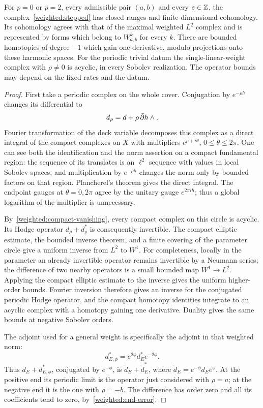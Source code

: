 \begin{proposition}\label{weighted:fredholm}
For $p=0$ or $p=2$, every admissible pair $(a,b)$ and every $s\in\mathbb Z$,
the complex~\eqref{weighted:stepped} has closed ranges and
finite-dimensional cohomology. Its cohomology agrees with that of the
maximal weighted $L^2$ complex and is represented by forms which belong
to $W^k_{a,b}$ for every $k$. There are bounded homotopies of degree $-1$
which gain one derivative, modulo projections onto these harmonic
spaces. For the periodic trivial datum the single-linear-weight complex
with $\rho\ne0$ is acyclic, in every Sobolev realization.
The operator bounds may depend on the fixed rates and the datum.
\end{proposition}

\begin{proof}
First take a periodic complex on the whole cover. Conjugation by
$e^{-\rho h}$ changes its differential to
\[
 d_\rho=d+\rho\,\bar\partial h\wedge.
\]
Fourier transformation of the deck variable decomposes this complex as a
direct integral of the compact complexes on $X$ with multipliers
$e^{\rho+i\theta}$, $0\le\theta\le2\pi$. One can see both the
identification and the norm assertion on a compact fundamental region:
the sequence of its translates is an $\ell^2$ sequence with values in
local Sobolev spaces, and multiplication by $e^{-\rho h}$ changes the
norm only by bounded factors on that region. Plancherel's theorem gives
the direct integral. The endpoint gauges at $\theta=0,2\pi$ agree by
the unitary gauge $e^{2\pi i h}$; thus a global logarithm of the
multiplier is unnecessary.

By~\eqref{weighted:compact-vanishing}, every compact complex on this
circle is acyclic. Its Hodge operator $d_\rho+d_\rho^*$ is consequently
invertible. The compact elliptic estimate, the bounded inverse theorem,
and a finite covering of the parameter circle give a uniform inverse
from $L^2$ to $W^1$. For completeness, locally in the parameter an
already invertible operator remains invertible by a Neumann series;
the difference of two nearby operators is a small bounded map
$W^1\to L^2$. Applying the compact elliptic estimate to the inverse
gives the uniform higher-order bounds. Fourier inversion therefore gives
an inverse for the conjugated periodic Hodge operator, and the compact
homotopy identities integrate to an acyclic complex with a homotopy
gaining one derivative. Duality gives the same bounds at negative
Sobolev orders.

The adjoint used for a general weight is specifically the adjoint in
that weighted norm:
\begin{equation}\label{weighted:adjoint}
 d_{E,\phi}^*=e^{2\phi}d_E^*e^{-2\phi}.
\end{equation}
Thus $d_E+d_{E,\phi}^*$, conjugated by $e^{-\phi}$, is
$\widetilde d_E+\widetilde d_E^*$, where
$\widetilde d_E=e^{-\phi}d_Ee^\phi$. At the positive end its periodic
limit is the operator just considered with $\rho=a$; at the negative
end it is the one with $\rho=-b$. The difference has order zero and all
its coefficients tend to zero, by~\eqref{weighted:end-error}.


\end{proof}
